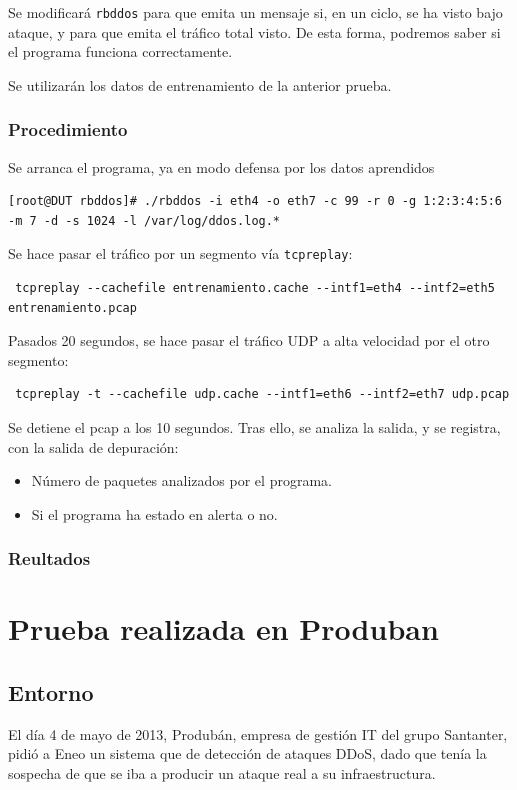 Se modificará \texttt{rbddos} para que emita un mensaje si, en un ciclo, se ha visto bajo ataque, y para que emita el 
tráfico total visto. De esta forma, podremos saber si el programa funciona correctamente.

Se utilizarán los datos de entrenamiento de la anterior prueba.

\subsubsection{Procedimiento}
Se arranca el programa, ya en modo defensa por los datos aprendidos
\begin{verbatim}
[root@DUT rbddos]# ./rbddos -i eth4 -o eth7 -c 99 -r 0 -g 1:2:3:4:5:6  -m 7 -d -s 1024 -l /var/log/ddos.log.*
\end{verbatim}

Se hace pasar el tráfico por un segmento vía \texttt{tcpreplay}:
\begin{verbatim}
 tcpreplay --cachefile entrenamiento.cache --intf1=eth4 --intf2=eth5 entrenamiento.pcap
\end{verbatim}

Pasados 20 segundos, se hace pasar el tráfico UDP a alta velocidad por el otro segmento:
\begin{verbatim}
 tcpreplay -t --cachefile udp.cache --intf1=eth6 --intf2=eth7 udp.pcap
\end{verbatim}

Se detiene el pcap a los 10 segundos. Tras ello, se analiza la salida, y se registra, con la salida de depuración:
\begin{itemize}
 \item Número de paquetes analizados por el programa.
 \item Si el programa ha estado en alerta o no.
\end{itemize}

\subsubsection{Reultados}

\section{Prueba realizada en Produban}
\subsection{Entorno}
El día 4 de mayo de 2013, Produbán, empresa de gestión IT del grupo Santanter, pidió a Eneo un sistema que de detección 
de ataques \gls{DDoS}, dado que tenía la sospecha de que se iba a producir un ataque real a su infraestructura.

